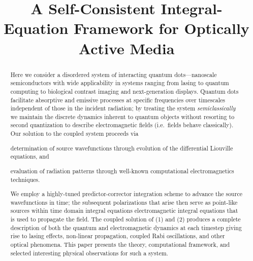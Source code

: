 \documentclass[conference]{IEEEtran}
\begin{document}
\title{A Self-Consistent Integral-Equation Framework for Optically Active Media}



\maketitle

\begin{abstract}
Here we consider a disordered system of interacting quantum dots---nanoscale semiconductors with wide applicability in systems ranging from lasing to quantum computing to biological contrast imaging and next-generation displays.
Quantum dots facilitate absorptive and emissive processes at specific frequencies over timescales independent of those in the incident radiation; by treating the system \emph{semiclassically} we maintain the discrete dynamics inherent to quantum objects without resorting to second quantization to describe electromagnetic fields (i.e.\ fields behave classically).
Our solution to the coupled system proceeds via
  \begin{inparaenum}[(1)]
  \item determination of source wavefunctions through evolution of the differential Liouville equations, and \label{enum:step 1}
  \item evaluation of radiation patterns through well-known computational electromagnetics techniques. \label{enum:step 2}
  \end{inparaenum}
We employ a highly-tuned predictor-corrector integration scheme to advance the source wavefunctions in time; the subsequent polarizations that arise then serve as point-like sources within time domain integral equations electromagnetic integral equations that is used to propagate the field.
The coupled solution of (1) and (2) produces a complete description of both the quantum and electromagnetic dynamics at each timestep giving rise to lasing effects, non-linear propagation, coupled Rabi oscillations, and other optical phenomena.
This paper presents the theory, computational framework, and selected interesting physical observations for such a system.
\end{abstract}
\end{document}

